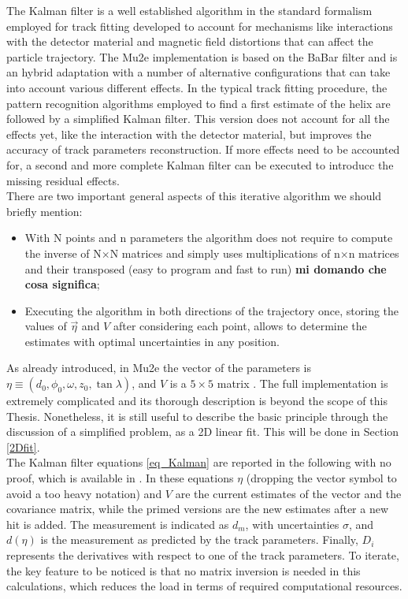 \documentclass[12pt,a4paper,openright, oneside, titlepage]{book} %
\begin{document}
\noindent The Kalman filter is a well established algorithm in the standard formalism employed for track fitting developed to account for mechanisms like interactions with the detector material and magnetic field distortions that can affect the particle trajectory. 
The Mu2e implementation is based on the BaBar filter and is an hybrid adaptation \cite{Kalman} \cite{Kalman:1987} 
with a number of alternative configurations that can take into account various different effects. 
In the typical track fitting procedure, 
the pattern recognition algorithms employed to find a first estimate of the helix are followed by a simplified Kalman filter. 
This version does not account for all the effects yet, 
like the interaction with the detector material, 
but improves the accuracy of track parameters reconstruction. 
If more effects need to be accounted for, 
a second and more complete Kalman filter can be executed 
to introducc the missing residual effects. \\
There are two important general aspects of this iterative algorithm we should briefly mention: 
\begin{itemize}
\item With N points and n parameters the algorithm does not require to compute the inverse of N$\times$N matrices and simply uses multiplications of n$\times$n matrices and their transposed (easy to program and fast to run)
{\bf{mi domando che cosa significa}};
\item Executing the algorithm in both directions of the trajectory once, storing the values of $\vec{\eta}$ and $V$ after considering each point, allows to determine the estimates with optimal uncertainties in any position.
\end{itemize} 
As already introduced, in Mu2e the vector of the parameters is $\eta \equiv ( d_0, \phi_0, \omega, z_0, \tan \lambda)$, and $V$ is a $5\times5$ matrix \cite{Kalman}.  
The full implementation is extremely complicated and its thorough description is beyond the scope
of this Thesis. 
Nonetheless, it is still useful to describe the basic principle through the discussion of a simplified problem, as a 2D linear fit. 
This will be done in Section \ref{2Dfit}.\\

\noindent
The Kalman filter equations \ref{eq_Kalman} are reported in the following with no proof, which is available in \cite{KutschkePaper}. 
In these equations $\eta$ (dropping the vector symbol to avoid a too heavy notation) and $V$ are the current estimates of the vector and the covariance matrix, while the primed versions are the new estimates after a new hit is added. 
The measurement is indicated as $d_m$, with uncertainties $\sigma$, 
and $d(\eta)$ is the measurement as predicted by the track parameters. 
Finally, $D_i$ represents the derivatives with respect to one of the track parameters. 
To iterate, the key feature to be noticed is that no matrix inversion is needed in this calculations,
which reduces the load in terms of required computational resources.
\end{document}
